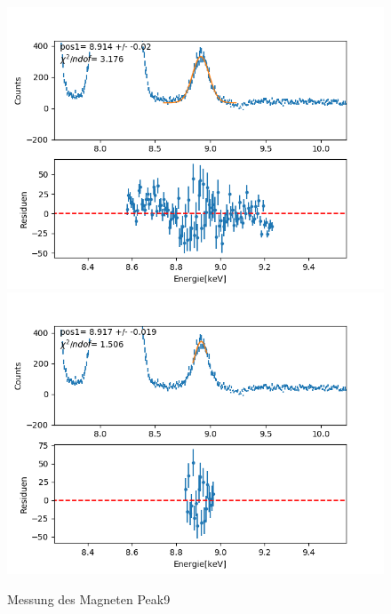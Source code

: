 \documentclass[12pt,a4paper]{article}
\begin{document}
\begin{figure}[H]
\centering
\includegraphics[scale=0.49]{Bilder/roentgen_spektren/magnet/mag9_1.png}
\includegraphics[scale=0.49]{Bilder/roentgen_spektren/magnet/mag9_2.png}
\caption{Messung des Magneten Peak9}
\end{figure}
\end{document}
